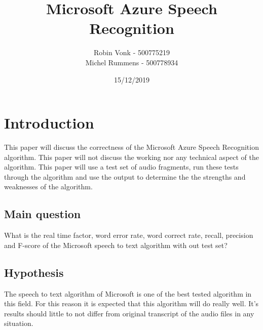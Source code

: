 \documentclass{article}
\begin{document}
\title{Microsoft Azure Speech Recognition}
\author{Robin Vonk - 500775219 \\
		Michel Rummens - 500778934 \\}
\date{15/12/2019}

\setlength{\columnsep}{30px}


\tableofcontents
\section{Introduction}
This paper will discuss the correctness of the Microsoft Azure Speech Recognition algorithm. This paper will not discuss the working nor any technical aspect of the algorithm. This paper will use a test set of audio fragments, run these tests through the algorithm and use the output to determine the the strengths and weaknesses of the algorithm.

\subsection{Main question}
What is the real time factor, word error rate, word correct rate, recall, precision and F-score of the Microsoft speech to text algorithm with out test set?

\subsection{Hypothesis}
The speech to text algorithm of Microsoft is one of the best tested algorithm in this field\cite{Veton}. For this reason it is expected that this algorithm will do really well. It's results should little to not differ from original transcript of the audio files in any situation.
\end{document}
